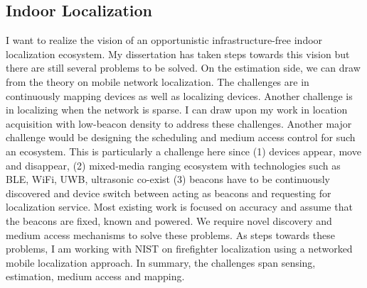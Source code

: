 \documentclass[10pt]{article}
\begin{document}
\subsection{Indoor Localization}
I want to realize the vision of an opportunistic infrastructure-free indoor localization ecosystem. My dissertation has taken steps towards this vision but there are still several problems to be solved. %
On the estimation side, we can draw from the theory on mobile network localization. The challenges are in continuously mapping devices as well as localizing devices. Another challenge is in localizing when the network is sparse. I can draw upon my work in location acquisition with low-beacon density to address these challenges. 
Another major challenge would be designing the scheduling and medium access control for such an ecosystem. This is particularly a challenge here since (1) devices appear, move and disappear, (2)  mixed-media ranging ecosystem with technologies such as BLE, WiFi, UWB, ultrasonic co-exist (3) beacons have to be continuously discovered and device switch between acting as beacons and requesting for localization service. Most existing work is focused on accuracy and assume that the beacons are fixed, known and powered. We require novel discovery and medium access mechanisms to solve these problems. As steps towards these problems, I am working with NIST on firefighter localization using a networked mobile localization approach. 
In summary, the challenges span sensing, estimation, medium access and mapping. 
\end{document}

